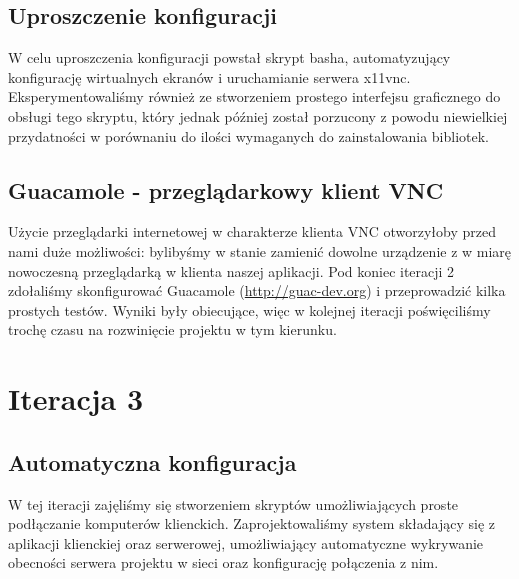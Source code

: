   \subsection{Uproszczenie konfiguracji}

    W celu uproszczenia konfiguracji powstał skrypt basha, automatyzujący konfigurację wirtualnych ekranów i uruchamianie serwera x11vnc. Eksperymentowaliśmy również ze stworzeniem prostego interfejsu graficznego do obsługi tego skryptu, który jednak później został porzucony z powodu niewielkiej przydatności w porównaniu do ilości wymaganych do zainstalowania bibliotek.


  \subsection{Guacamole - przeglądarkowy klient VNC}

    Użycie przeglądarki internetowej w charakterze klienta VNC otworzyłoby przed nami duże możliwości: bylibyśmy w stanie zamienić dowolne urządzenie z w miarę nowoczesną przeglądarką w klienta naszej aplikacji. Pod koniec iteracji 2 zdołaliśmy skonfigurować Guacamole (\url{http://guac-dev.org}) i przeprowadzić kilka prostych testów. Wyniki były obiecujące, więc w kolejnej iteracji poświęciliśmy trochę czasu na rozwinięcie projektu w tym kierunku.

    \vfill
    \pagebreak

\section{Iteracja 3}

  \subsection{Automatyczna konfiguracja}

    W tej iteracji zajęliśmy się stworzeniem skryptów umożliwiających proste podłączanie komputerów klienckich. Zaprojektowaliśmy system składający się z aplikacji klienckiej oraz serwerowej, umożliwiający automatyczne wykrywanie obecności serwera projektu w sieci oraz konfigurację połączenia z nim.

